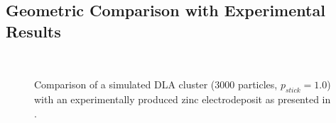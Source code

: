 \documentclass[11pt]{iopart}
\begin{document}
\subsection{Geometric Comparison with Experimental Results}

\begin{figure}[t]
    \centering
    \quad
     \\
 
    \caption{Comparison of a simulated DLA cluster (3000 particles, $p_{stick} = 1.0$) with an experimentally produced zinc electrodeposit as presented in \cite{dla}.}
    \label{fig:realcrystal}
\end{figure}
\end{document}
